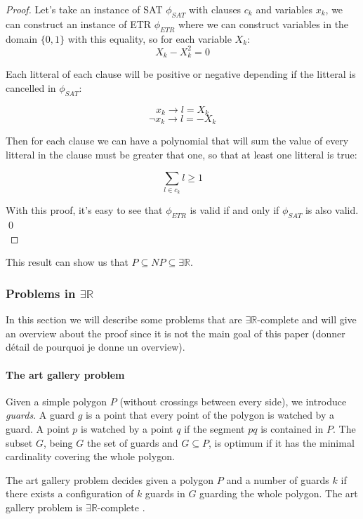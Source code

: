 \begin{proof}
  Let's take an instance of SAT $\phi_{SAT}$ with clauses $c_k$ and variables
  $x_k$, we can construct an instance of ETR $\phi_{ETR}$ where we can
  construct variables in the domain $\{0,1\}$ with this equality, so for each
  variable $X_k$:
  $$X_k - X_k^2 = 0$$

  Each litteral of each clause will be positive or negative depending if the litteral is cancelled in $\phi_{SAT}$:

  $$x_k \to l = X_k$$
  $$\neg x_k \to l = -X_k$$

  Then for each clause we can have a polynomial that will sum the value of every litteral in the clause must be greater that one, so that at least one litteral is true:

  $$\sum_{l\in c_k} l \geq 1$$

  With this proof, it's easy to see that $\phi_{ETR}$ is valid if and only if $\phi_{SAT}$ is also valid.  \qed\\

\end{proof}

This result can show us that $P \subseteq NP \subseteq \exists \mathbb{R}$.

\subsubsection{Problems in $\exists \mathbb{R}$}

In this section we will describe some problems that are $\exists
\mathbb{R}$-complete and will give an overview about the proof since it is
not the main goal of this paper (donner détail de pourquoi je donne un
overview).

\paragraph{The art gallery problem} Given a simple polygon $P$ (without
crossings between every side), we introduce \textit{guards}. A guard
$g$ is a point that every point of the polygon is watched by a guard.
A point $p$ is watched by a point $q$ if the segment $pq$ is contained
in $P$. The subset $G$, being $G$ the set of guards and $G \subseteq
P$, is optimum if it has the minimal cardinality covering the whole
polygon.

The art gallery problem decides given a polygon $P$ and a number of
guards $k$ if there exists a configuration of $k$ guards in $G$
guarding the whole polygon. The art gallery problem is $\exists
\mathbb{R}$-complete \cite{abrahamsenArtGalleryProblem2017}.


